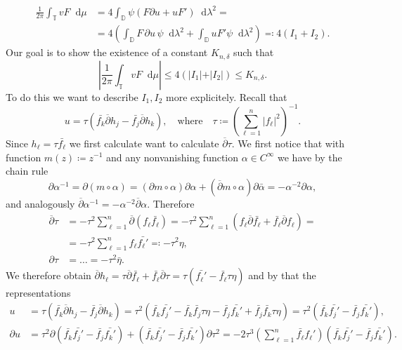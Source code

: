 \documentclass[letterpaper, 11pt]{article}
\newcommand{\D}{\mathbb{D}}
\newcommand{\T}{\mathbb{T}}
\newcommand{\1}{\mathds{1}}
\newcommand{\dd}{\mathop{}\!\mathrm{d}}
\newcommand{\wirtz}{\partial}
\newcommand{\wirtzbar}{\overline{\partial}}
\theoremstyle{definition}
\newenvironment{innerproof}
 {\renewcommand{\qedsymbol}{}\proof}
 {\endproof}
\begin{document}
\begin{innerproof}[Proof (continued)]
\begin{align*}
    \frac{1}{2 \pi} \int_\T v F \dd \mu &= 4 \int_\D \psi \left( F \wirtz u + u F' \right) \dd \lambda^2 = \\ 
    &= 4 \left( \int_\D F \, \wirtz u \, \psi \dd \lambda^2 + \int_\D u F' \psi \dd \lambda^2 \right) \eqqcolon 4 (I_1 + I_2).
  \end{align*}
  Our goal is to show the existence of a constant $K_{n,\delta}$ such that
  $$ \left\vert \frac{1}{2 \pi} \int_\T v F \dd \mu \right\vert \leq 4 (\vert I_1 \vert + \vert I_2 \vert) \leq K_{n,\delta}. $$
  To do this we want to describe $I_1, I_2$ more explicitely. Recall that
  $$ u = \tau ( \bar{f_k} \wirtzbar h_j - \bar{f_j} \wirtzbar h_k), \quad \textrm{where} \quad \tau \coloneqq \left( \sum_{\ell=1}^n \vert f_\ell \vert^2 \right)^{-1}. $$
  Since $h_\ell = \tau \bar{f_\ell}$ we first calculate want to calculate $\wirtzbar \tau$. We first notice that with function $m(z) \coloneqq z^{-1}$ and any nonvanishing function $\alpha \in C^\infty$ we have by the chain rule
  $$ \wirtz \alpha^{-1} = \wirtz (m \circ \alpha) = (\wirtz m \circ \alpha) \wirtz \alpha + (\wirtzbar m \circ \alpha) \wirtz \bar{\alpha} = -\alpha^{-2} \partial \alpha, $$
  and analogously $\wirtzbar \alpha^{-1} = -\alpha^{-2} \wirtzbar \alpha$. Therefore
  \begin{align*}
    \wirtzbar \tau &= - \tau^2 \sum_{\ell=1}^n \wirtzbar (f_\ell \bar{f_\ell}) = -\tau^2 \sum_{\ell=1}^n ( f_\ell \wirtzbar \bar{f_\ell} + \bar{f_\ell} \wirtzbar f_\ell ) = \\
    &= -\tau^2 \sum_{\ell=1}^n f_\ell \bar{f_\ell'} \eqqcolon -\tau^2 \eta, \\
    \wirtz \tau &= \dots = -\tau^2 \bar{\eta}.
  \end{align*}
  We therefore obtain $ \wirtzbar h_\ell = \tau \wirtzbar \bar{f_\ell} + \bar{f_\ell} \wirtzbar \tau = \tau ( \bar{f_\ell'} - \bar{f_\ell} \tau \eta ) $ and by that the representations
  \begin{align*}
    u &= \tau ( \bar{f_k} \wirtzbar h_j - \bar{f_j} \wirtzbar h_k) = \tau^2 ( \bar{f_k} \bar{f_j'} - \bar{f_k} \bar{f_j} \tau \eta - \bar{f_j} \bar{f_k'} + \bar{f_j} \bar{f_k} \tau \eta ) = \tau^2 ( \bar{f_k} \bar{f_j'} - \bar{f_j} \bar{f_k'} ), \\
    \partial u &= \tau^2 \partial ( \bar{f_k} \bar{f_j'} - \bar{f_j} \bar{f_k'} ) + ( \bar{f_k} \bar{f_j'} - \bar{f_j} \bar{f_k'} ) \partial \tau^2 = -2 \tau^3 \left( \sum_{\ell=1}^n \bar{f_\ell} f_\ell' \right) ( \bar{f_k} \bar{f_j'} - \bar{f_j} \bar{f_k'} ).
  \end{align*}

\end{innerproof}
\end{document}
